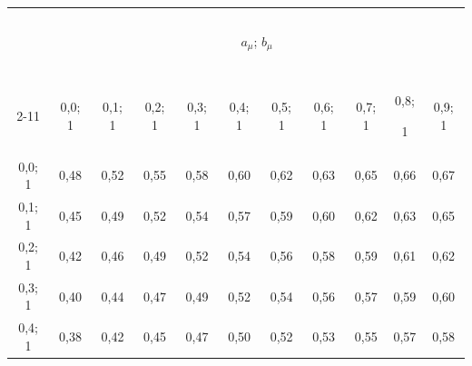 \begin{table}[b]\small %


\vspace*{-12pt}


\begin{center}




\vspace*{2ex}





\tabcolsep=4.3pt


\begin{tabular}{|c|c|c|c|c|c|c|c|c|c|c|}


\hline


&\multicolumn{10}{c|}{\ }\\[-9pt]


&\multicolumn{10}{c|}{$a_{\mu}$; $b_{\mu}$}\\


&\multicolumn{10}{c|}{\ }\\[-9pt]


\cline{2-11}




\multicolumn{1}{|c|}{\raisebox{6pt}[0pt][0pt]{$a_{\lambda}$; $b_{\lambda}$}}


& 0,0;  1& 0,1;  1& 0,2;  1& 0,3;  1& 0,4;  1& 0,5;  1& 0,6;  1& 0,7;  1& 0,8;  


1& 0,9;  1\\


\hline


 0,0;  1& 0,48& 0,52& 0,55& 0,58& 0,60& 0,62& 0,63& 0,65& 0,66& 0,67\\


 0,1;  1& 0,45& 0,49& 0,52& 0,54& 0,57& 0,59& 0,60& 0,62& 0,63& 0,65\\


 0,2;  1& 0,42& 0,46& 0,49& 0,52& 0,54& 0,56& 0,58& 0,59& 0,61& 0,62\\


 0,3;  1& 0,40& 0,44& 0,47& 0,49& 0,52& 0,54& 0,56& 0,57& 0,59& 0,60\\


 0,4;  1& 0,38& 0,42& 0,45& 0,47& 0,50& 0,52& 0,53& 0,55& 0,57& 0,58\\



\end{tabular}
\end{center}
\end{table}
